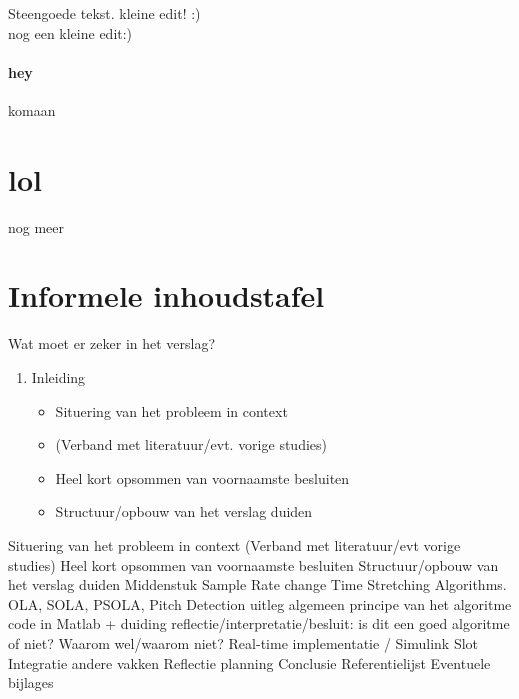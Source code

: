 \documentclass[10pt]{report}
\begin{document}
Steengoede tekst.
kleine edit! :)\\
nog een kleine edit:)

\paragraph{hey}
komaan


\section{lol}
nog meer



\section{Informele inhoudstafel}
Wat moet er zeker in het verslag?
\begin{enumerate}
\item Inleiding
\begin{itemize}
\item Situering van het probleem in context
\item (Verband met literatuur/evt. vorige studies)
\item Heel kort opsommen van voornaamste besluiten
\item Structuur/opbouw van het verslag duiden
\end{itemize}
\end{enumerate}
Situering van het probleem in context
(Verband met literatuur/evt vorige studies)
Heel kort opsommen van voornaamste besluiten
Structuur/opbouw van het verslag duiden
Middenstuk
Sample Rate change
Time Stretching Algorithms. OLA, SOLA, PSOLA, Pitch Detection
uitleg algemeen principe van het algoritme
code in Matlab + duiding
reflectie/interpretatie/besluit: is dit een goed algoritme of niet? Waarom wel/waarom niet?
Real-time implementatie / Simulink
Slot
Integratie andere vakken
Reflectie planning
Conclusie
Referentielijst
Eventuele bijlages
\end{document}
